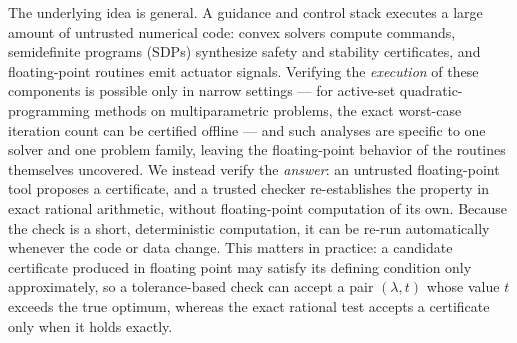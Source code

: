 \documentclass[11pt]{article}
\theoremstyle{plain}
\theoremstyle{remark}
\begin{document}
The underlying idea is general. A guidance and control stack executes a large
amount of untrusted
numerical code: convex solvers compute commands, semidefinite programs (SDPs)
synthesize safety and stability certificates, and floating-point routines emit
actuator signals. Verifying the \emph{execution} of these components is possible
only in narrow settings --- for active-set quadratic-programming methods on
multiparametric problems, the exact worst-case iteration count can be certified
offline \cite{arnstrom2022} --- and such analyses are specific to one solver and
one problem family, leaving the floating-point behavior of the routines
themselves uncovered. We instead verify the \emph{answer}: an
untrusted floating-point tool proposes a certificate, and a trusted checker
re-establishes the property in exact rational arithmetic, without floating-point
computation of its own. Because the check is a short, deterministic computation,
it can be re-run automatically whenever the code or data change. This matters in
practice: a candidate certificate produced in floating point may satisfy its
defining condition only approximately, so a tolerance-based check can accept a
pair $(\lambda, t)$ whose value $t$ exceeds the true optimum, whereas the exact
rational test accepts a certificate only when it holds exactly.
\end{document}
